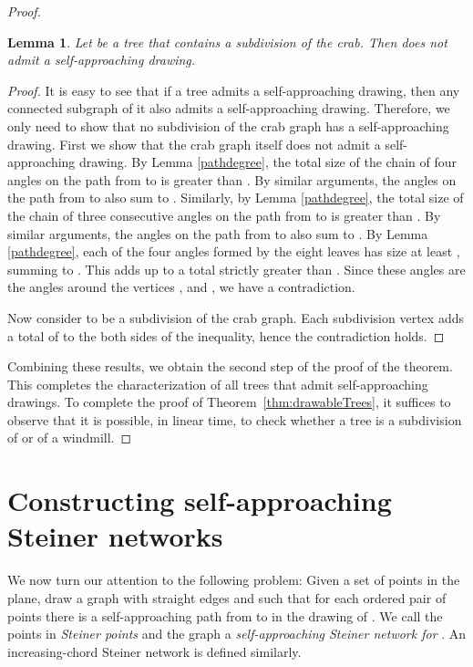 \documentclass[11pt]{article}
\newtheorem{lemma}[theorem]{Lemma}
\newcommand{\changeS}[1]{{#1}}
\begin{document}
\begin{proof}
\begin{lemma}
\label{subcrablemma}
Let  be a tree that contains a subdivision of the crab.  Then  does not admit a self-approaching drawing.
\end{lemma}
\begin{proof}
It is easy to see that if a tree admits a self-approaching drawing, then any connected subgraph of it also admits a self-approaching drawing. Therefore, we only need to show that no subdivision of the crab graph has a self-approaching drawing. \changeS{First we show that the crab graph itself does not admit a self-approaching drawing.} By Lemma \ref{pathdegree}, the total size of the chain of four angles on the path from  to  is greater than . By similar arguments, the angles on the path from  to  also sum to . Similarly, by Lemma \ref{pathdegree}, the total size of the chain of three consecutive angles on the path from  to  is greater than . By similar arguments, the angles on the path from  to  also sum to . By Lemma \ref{pathdegree}, each of the four angles formed by the eight leaves has size at least , summing to . This adds up to a total strictly greater than . Since these angles are the angles around the  vertices , and , we have a contradiction.

\changeS{Now consider  to be a subdivision of the crab graph. Each subdivision vertex adds a total of  to the both sides of the inequality, hence the contradiction holds.}
\end{proof}

Combining these results, we obtain the second step of the proof of the theorem.  This completes the characterization of all trees that admit self-approaching drawings.  To complete the proof of Theorem~\ref{thm:drawableTrees}, it suffices to observe that it is possible, in linear time, to check whether a tree  is a subdivision of  or of a windmill.
\end{proof}




\section{Constructing self-approaching Steiner networks}
\label{sec:SAspanners}
We now turn our attention to the following problem: Given a set  of points in the plane, draw a graph  with straight edges and  such that for each ordered pair of points  there is a self-approaching path from  to  in the drawing of . We call the points in   \emph{Steiner points} and the graph  a \emph{self-approaching Steiner network for }. An increasing-chord Steiner network is defined similarly.
\end{document}
